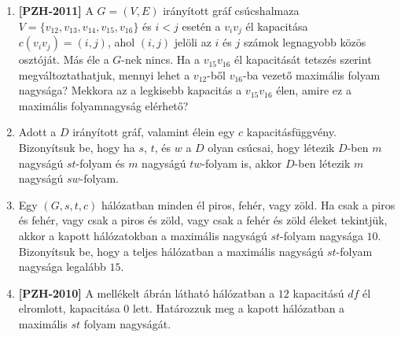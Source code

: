 \documentclass[a4paper, 12pt]{article}
\begin{document}
\begin{enumerate}
            \item \textbf{[PZH-2011]} A $G=(V,E)$ irányított gráf csúcshalmaza $V=\{v_{12},v_{13},v_{14},v_{15},v_{16}\}$ és $i < j$ esetén a $v_i v_j$ él kapacitása $c(v_i v_j) = (i,j)$, ahol $(i,j)$ jelöli az $i$ és $j$ számok legnagyobb közös osztóját. Más éle a $G$-nek nincs. Ha a $v_{15}v_{16}$ él kapacitását tetszés szerint megváltoztathatjuk, mennyi lehet a $v_{12}$-ből $v_{16}$-ba vezető maximális folyam nagysága? Mekkora az a legkisebb kapacitás a $v_{15}v_{16}$ élen, amire ez a maximális folyamnagyság elérhető?
            \item Adott a $D$ irányított gráf, valamint élein egy $c$ kapacitásfüggvény. Bizonyítsuk be, hogy ha $s$, $t$, és $w$ a $D$ olyan csúcsai, hogy létezik $D$-ben $m$ nagyságú $st$-folyam és $m$ nagyságú $tw$-folyam is, akkor $D$-ben létezik $m$ nagyságú $sw$-folyam.
            \item Egy $(G, s, t, c)$ hálózatban minden él piros, fehér, vagy zöld. Ha csak a piros és fehér, vagy csak a piros és zöld, vagy csak a fehér és zöld éleket tekintjük, akkor a kapott hálózatokban a maximális nagyságú $st$-folyam nagysága $10$. Bizonyítsuk be, hogy a teljes hálózatban a maximális nagyságú $st$-folyam nagysága legalább $15$.
            \item \textbf{[PZH-2010]} A mellékelt ábrán látható hálózatban a $12$ kapacitású $df$ él elromlott, kapacitása $0$ lett. Határozzuk meg a kapott hálózatban a maximális $st$ folyam nagyságát.
            \begin{figure}[!ht]
                \centering
                
            \end{figure}
            

\end{enumerate}
\end{document}
